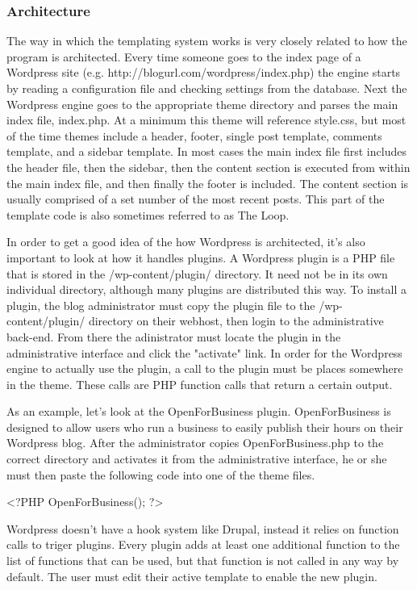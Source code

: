 \documentclass[a4paper,12pt]{report}
\begin{document}
\subsubsection{Architecture}
The way in which the templating system works is very closely related to how the program is architected. 
Every time someone goes to the index page of a Wordpress site (e.g. http://blogurl.com/wordpress/index.php) the engine starts by reading a configuration file and checking settings from the database. 
Next the Wordpress engine goes to the appropriate theme directory and parses the main index file, index.php. 
At a minimum this theme will reference style.css, but most of the time themes include a header, footer, single post template, comments template, and a sidebar template. 
In most cases the main index file first includes the header file, then the sidebar, then the content section is executed from within the main index file, and then finally the footer is included. 
The content section is usually comprised of a set number of the most recent posts. 
This part of the template code is also sometimes referred to as The Loop. 


In order to get a good idea of the how Wordpress is architected, it's also important to look at how it handles plugins. 
A Wordpress plugin is a PHP file that is stored in the /wp-content/plugin/ directory. 
It need not be in its own individual directory, although many plugins are distributed this way. 
To install a plugin, the blog administrator must copy the plugin file to the /wp-content/plugin/ directory on their webhost, then login to the administrative back-end. 
From there the adinistrator must locate the plugin in the administrative interface and click the "activate" link. 
In order for the Wordpress engine to actually use the plugin, a call to the plugin must be places somewhere in the theme. 
These calls are PHP function calls that return a certain output. 


As an example, let's look at the OpenForBusiness plugin. 
OpenForBusiness is designed to allow users who run a business to easily publish their hours on their Wordpress blog. 
After the administrator copies OpenForBusiness.php to the correct directory and activates it from the administrative interface, he or she must then paste the following code into one of the theme files. 


<?PHP OpenForBusiness(); ?>


Wordpress doesn't have a hook system like Drupal, instead it relies on function calls to triger plugins. 
Every plugin adds at least one additional function to the list of functions that can be used, but that function is not called in any way by default. 
The user must edit their active template to enable the new plugin. 
\end{document}
